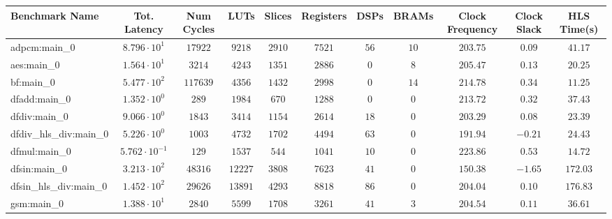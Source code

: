 \begin{tabular}{|l|c|c|c|c|c|c|c|c|c|c|}
\hline
Benchmark Name          & Tot. Latency            & Num Cycles & LUTs      & Slices    & Registers & DSPs    & BRAMs   & Clock Frequency & Clock Slack & HLS Time(s) \\
\hline
adpcm:main\_0           & $ 8.796 \cdot 10^{1}  $ & $ 17922  $ & $ 9218  $ & $ 2910  $ & $ 7521  $ & $ 56  $ & $ 10  $ & $ 203.75      $ & $ 0.09    $ & $ 41.17   $ \\
aes:main\_0             & $ 1.564 \cdot 10^{1}  $ & $ 3214   $ & $ 4243  $ & $ 1351  $ & $ 2886  $ & $ 0   $ & $ 8   $ & $ 205.47      $ & $ 0.13    $ & $ 20.25   $ \\
bf:main\_0              & $ 5.477 \cdot 10^{2}  $ & $ 117639 $ & $ 4356  $ & $ 1432  $ & $ 2998  $ & $ 0   $ & $ 14  $ & $ 214.78      $ & $ 0.34    $ & $ 11.25   $ \\
dfadd:main\_0           & $ 1.352 \cdot 10^{0}  $ & $ 289    $ & $ 1984  $ & $ 670   $ & $ 1288  $ & $ 0   $ & $ 0   $ & $ 213.72      $ & $ 0.32    $ & $ 37.43   $ \\
dfdiv:main\_0           & $ 9.066 \cdot 10^{0}  $ & $ 1843   $ & $ 3414  $ & $ 1154  $ & $ 2614  $ & $ 18  $ & $ 0   $ & $ 203.29      $ & $ 0.08    $ & $ 23.39   $ \\
dfdiv\_hls\_div:main\_0 & $ 5.226 \cdot 10^{0}  $ & $ 1003   $ & $ 4732  $ & $ 1702  $ & $ 4494  $ & $ 63  $ & $ 0   $ & $ 191.94      $ & $ -0.21   $ & $ 24.43   $ \\
dfmul:main\_0           & $ 5.762 \cdot 10^{-1} $ & $ 129    $ & $ 1537  $ & $ 544   $ & $ 1041  $ & $ 10  $ & $ 0   $ & $ 223.86      $ & $ 0.53    $ & $ 14.72   $ \\
dfsin:main\_0           & $ 3.213 \cdot 10^{2}  $ & $ 48316  $ & $ 12227 $ & $ 3808  $ & $ 7623  $ & $ 41  $ & $ 0   $ & $ 150.38      $ & $ -1.65   $ & $ 172.03  $ \\
dfsin\_hls\_div:main\_0 & $ 1.452 \cdot 10^{2}  $ & $ 29626  $ & $ 13891 $ & $ 4293  $ & $ 8818  $ & $ 86  $ & $ 0   $ & $ 204.04      $ & $ 0.10    $ & $ 176.83  $ \\
gsm:main\_0             & $ 1.388 \cdot 10^{1}  $ & $ 2840   $ & $ 5599  $ & $ 1708  $ & $ 3261  $ & $ 41  $ & $ 3   $ & $ 204.54      $ & $ 0.11    $ & $ 36.61   $ \\

\end{tabular}
